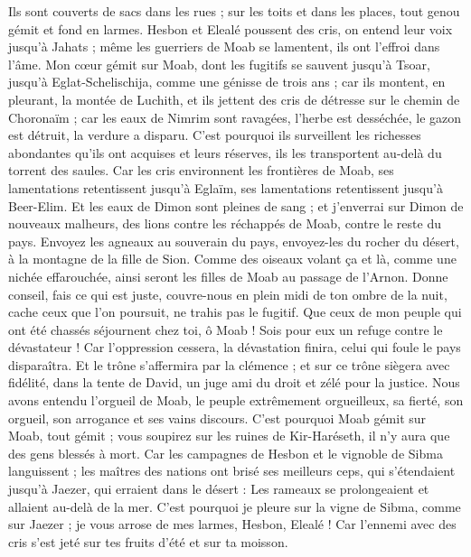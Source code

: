 \begin{multicols}{2}
Ils sont couverts de sacs dans les rues ; sur les toits et dans les places, tout genou gémit et fond en larmes.
Hesbon et Elealé poussent des cris, on entend leur voix jusqu'à Jahats ; même les guerriers de Moab se lamentent, ils ont l'effroi dans l'âme.
Mon cœur gémit sur Moab, dont les fugitifs se sauvent jusqu'à Tsoar, jusqu'à Eglat-Schelischija, comme une génisse de trois ans ; car ils montent, en pleurant, la montée de Luchith, et ils jettent des cris de détresse sur le chemin de Choronaïm ;
car les eaux de Nimrim sont ravagées, l'herbe est desséchée, le gazon est détruit, la verdure a disparu.
C'est pourquoi ils surveillent les richesses abondantes qu'ils ont acquises et leurs réserves, ils les transportent au-delà du torrent des saules.
Car les cris environnent les frontières de Moab, ses lamentations retentissent jusqu'à Eglaïm, ses lamentations retentissent jusqu'à Beer-Elim.
Et les eaux de Dimon sont pleines de sang ; et j'enverrai sur Dimon de nouveaux malheurs, des lions contre les réchappés de Moab, contre le reste du pays.
\VerseOne{}Envoyez les agneaux au souverain du pays, envoyez-les du rocher du désert, à la montagne de la fille de Sion.
Comme des oiseaux volant ça et là, comme une nichée effarouchée, ainsi seront les filles de Moab au passage de l'Arnon.
Donne conseil, fais ce qui est juste, couvre-nous en plein midi de ton ombre de la nuit, cache ceux que l'on poursuit, ne trahis pas le fugitif.
Que ceux de mon peuple qui ont été chassés séjournent chez toi, ô Moab ! Sois pour eux un refuge contre le dévastateur ! Car l'oppression cessera, la dévastation finira, celui qui foule le pays disparaîtra.
Et le trône s'affermira par la clémence ; et sur ce trône siègera avec fidélité, dans la tente de David, un juge ami du droit et zélé pour la justice.
Nous avons entendu l'orgueil de Moab, le peuple extrêmement orgueilleux, sa fierté, son orgueil, son arrogance et ses vains discours.
C'est pourquoi Moab gémit sur Moab, tout gémit ; vous soupirez sur les ruines de Kir-Haréseth, il n'y aura que des gens blessés à mort.
Car les campagnes de Hesbon et le vignoble de Sibma languissent ; les maîtres des nations ont brisé ses meilleurs ceps, qui s'étendaient jusqu'à Jaezer, qui erraient dans le désert : Les rameaux se prolongeaient et allaient au-delà de la mer.
C'est pourquoi je pleure sur la vigne de Sibma, comme sur Jaezer ; je vous arrose de mes larmes, Hesbon, Elealé ! Car l'ennemi avec des cris s'est jeté sur tes fruits d'été et sur ta moisson.

\end{multicols}
